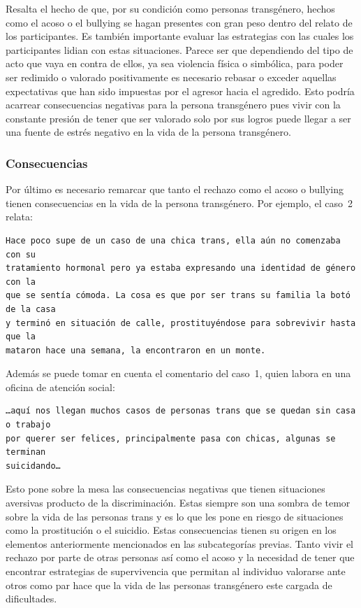 Resalta el hecho de que, por su condición como personas transgénero, hechos como
el acoso o el bullying se hagan presentes con gran peso dentro del relato de los
participantes. Es también importante evaluar las estrategias con las cuales los
participantes lidian con estas situaciones. Parece ser que dependiendo del tipo
de acto que vaya en contra de ellos, ya sea violencia física o simbólica, para
poder ser redimido o valorado positivamente es necesario rebasar o exceder
aquellas expectativas que han sido impuestas por el agresor hacia el agredido.
Esto podría acarrear consecuencias negativas para la persona transgénero pues
vivir con la constante presión de tener que ser valorado solo por sus logros
puede llegar a ser una fuente de estrés negativo en la vida de la persona
transgénero.

\subsubsection{Consecuencias}

Por último es necesario remarcar que tanto el rechazo como el acoso o bullying
tienen consecuencias en la vida de la persona transgénero. Por ejemplo, el caso~2
relata:

\begin{verbatim}
Hace poco supe de un caso de una chica trans, ella aún no comenzaba con su
tratamiento hormonal pero ya estaba expresando una identidad de género con la
que se sentía cómoda. La cosa es que por ser trans su familia la botó de la casa
y terminó en situación de calle, prostituyéndose para sobrevivir hasta que la
mataron hace una semana, la encontraron en un monte.
\end{verbatim}

Además se puede tomar en cuenta el comentario del caso~1, quien labora en una
oficina de atención social:

\begin{verbatim}
…aquí nos llegan muchos casos de personas trans que se quedan sin casa o trabajo
por querer ser felices, principalmente pasa con chicas, algunas se terminan
suicidando…
\end{verbatim}

 Esto pone sobre la mesa las consecuencias negativas que tienen situaciones
 aversivas producto de la discriminación. Estas siempre son una sombra de temor
 sobre la vida de las personas trans y es lo que les pone en riesgo de
 situaciones como la prostitución o el suicidio. Estas consecuencias tienen su
 origen en los elementos anteriormente mencionados en las subcategorías previas.
 Tanto vivir el rechazo por parte de otras personas así como el acoso y la
 necesidad de tener que encontrar estrategias de supervivencia que permitan al
 individuo valorarse ante otros como par hace que la vida de las personas
 transgénero este cargada de dificultades.

